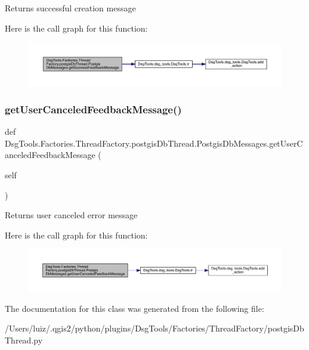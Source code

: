 \begin{DoxyVerb}Returns successful creation message
\end{DoxyVerb}
 Here is the call graph for this function\+:
\nopagebreak
\begin{figure}[H]
\begin{center}
\leavevmode
\includegraphics[width=350pt]{class_dsg_tools_1_1_factories_1_1_thread_factory_1_1postgis_db_thread_1_1_postgis_db_messages_a6b803c58e0b8614b609ccbe8d6c26167_cgraph}
\end{center}
\end{figure}
\mbox{\label{class_dsg_tools_1_1_factories_1_1_thread_factory_1_1postgis_db_thread_1_1_postgis_db_messages_a330283886226815b7abc36f9b091bc62}} 
\subsubsection{\texorpdfstring{get\+User\+Canceled\+Feedback\+Message()}{getUserCanceledFeedbackMessage()}}
{\footnotesize\ttfamily def Dsg\+Tools.\+Factories.\+Thread\+Factory.\+postgis\+Db\+Thread.\+Postgis\+Db\+Messages.\+get\+User\+Canceled\+Feedback\+Message (\begin{DoxyParamCaption}\item[{}]{self }\end{DoxyParamCaption})}

\begin{DoxyVerb}Returns user canceled error message
\end{DoxyVerb}
 Here is the call graph for this function\+:
\nopagebreak
\begin{figure}[H]
\begin{center}
\leavevmode
\includegraphics[width=350pt]{class_dsg_tools_1_1_factories_1_1_thread_factory_1_1postgis_db_thread_1_1_postgis_db_messages_a330283886226815b7abc36f9b091bc62_cgraph}
\end{center}
\end{figure}


The documentation for this class was generated from the following file\+:\begin{DoxyCompactItemize}
\item 
/\+Users/luiz/.\+qgis2/python/plugins/\+Dsg\+Tools/\+Factories/\+Thread\+Factory/postgis\+Db\+Thread.\+py\end{DoxyCompactItemize}
